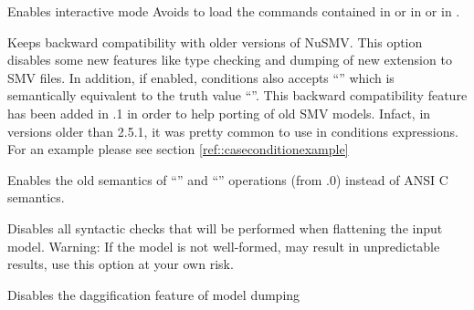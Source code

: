\begin{nusmvTable}



 {Enables interactive mode}
 {%
Avoids to load the \nusmv commands contained in  or in   or in 
.} 
\vindex{\stdsyslib}

 {%
%
Keeps backward compatibility with older versions of NuSMV. This option
disables some new features like type checking and dumping of new
extension to SMV files. In addition, if enabled, 
conditions also accepts ``'' which is semantically equivalent
to the truth value ``''. This backward compatibility
feature has been added in .1 in order to help porting of old
SMV models. Infact, in versions older than 2.5.1, it was pretty common
to use  in  conditions expressions. For an example
please see section \ref{ref::caseconditionexample}}

 {%
%
Enables the old semantics of ``\code{/}'' and ``'' operations (from
.0) instead of ANSI C semantics.}

 {%
%
Disables all syntactic checks that will be performed when flattening
the input model. Warning: If the model is not well-formed, \nusmv may
result in unpredictable results, use this option at your own risk.}

 {%
%
Disables the daggification feature of model dumping}


\end{nusmvTable}
